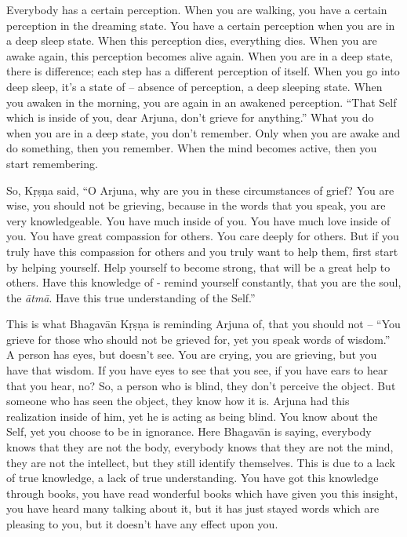 Everybody has a certain perception. When you are walking, you have a certain perception in the dreaming state. You have a certain perception when you are in a deep sleep state. When this perception dies, everything dies. When you are awake again, this perception becomes alive again. When you are in a deep state, there is difference; each step has a different perception of itself. When you go into deep sleep, it’s a state of – absence of perception, a deep sleeping state. When you awaken in the morning, you are again in an awakened perception. “That Self which is inside of you, dear Arjuna, don’t grieve for anything.” What you do when you are in a deep state, you don’t remember. Only when you are awake and do something, then you remember. When the mind becomes active, then you start remembering.

So, Kṛṣṇa said, “O Arjuna, why are you in these circumstances of grief? You are wise, you should not be grieving, because in the words that you speak, you are very knowledgeable. You have much inside of you. You have much love inside of you. You have great compassion for others. You care deeply for others. But if you truly have this compassion for others and you truly want to help them, first start by helping yourself. Help yourself to become strong, that will be a great help to others. Have this knowledge of - remind yourself constantly, that you are the soul, the \textit{ātmā}. Have this true understanding of the Self.”

This is what Bhagavān Kṛṣṇa is reminding Arjuna of, that you should not – “You grieve for those who should not be grieved for, yet you speak words of wisdom.” A person has eyes, but doesn’t see. You are crying, you are grieving, but you have that wisdom. If you have eyes to see that you see, if you have ears to hear that you hear, no? So, a person who is blind, they don’t perceive the object. But someone who has seen the object, they know how it is. Arjuna had this realization inside of him, yet he is acting as being blind. You know about the Self, yet you choose to be in ignorance. Here Bhagavān is saying, everybody knows that they are not the body, everybody knows that they are not the mind, they are not the intellect, but they still identify themselves. This is due to a lack of true knowledge, a lack of true understanding. You have got this knowledge through books, you have read wonderful books which have given you this insight, you have heard many talking about it, but it has just stayed words which are pleasing to you, but it doesn’t have any effect upon you.

